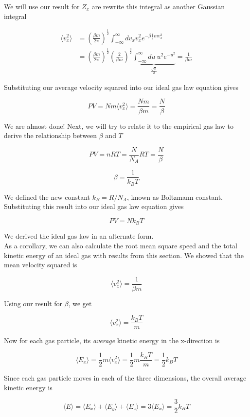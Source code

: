 \documentclass[12pt, a4paper]{article}
\begin{document}
We will use our result for $Z_x$ are rewrite this integral as another Gaussian integral

\begin{align*}
\langle v_x^2 \rangle &= \left( \frac{\beta m}{2\pi} \right)^{\frac12} \int_{-\infty}^\infty dv_x v_x^2 e^{-\beta \frac{1}{2}m v_x^2} \\
&= \left( \frac{\beta m}{2\pi} \right)^{\frac12} \left( \frac{2}{\beta m} \right)^{\frac32} \underbrace{\int_{-\infty}^\infty du \: u^2 e^{-u^2}}_{\frac{\sqrt{\pi}}{2}} = \frac{1}{\beta m}
\end{align*}

Substituting our average velocity squared into our ideal gas law equation gives

$$PV=Nm\langle v_x^2 \rangle=\frac{Nm}{\beta m}=\frac{N}{\beta}$$

We are almost done! Next, we will try to relate it to the empirical gas law to derive the relationship between $\beta$ and $T$

$$PV=nRT=\frac{N}{N_A}RT=\frac{N}{\beta}$$

$$\boxed{\beta=\frac{1}{k_BT}}$$

We defined the new constant $k_B=R/N_A$, known as Boltzmann constant. Substituting this result into our ideal gas law equation gives

$$\boxed{PV=Nk_BT}$$

We derived the ideal gas law in an alternate form. \\

As a corollary, we can also calculate the root mean square speed and the total kinetic energy of an ideal gas with results from this section. We showed that the mean velocity squared is

$$\langle v_x^2 \rangle=\frac{1}{\beta m}$$

Using our result for $\beta$, we get

$$\langle v_x^2 \rangle=\frac{k_BT}{m}$$

Now for each gas particle, its \textit{average} kinetic energy in the x-direction is

$$\langle E_x \rangle = \frac12m\langle v_x^2 \rangle = \frac12m\frac{k_BT}{m}=\frac12k_BT$$

Since each gas particle moves in each of the three dimensions, the overall average kinetic energy is

$$\langle E \rangle = \langle E_x \rangle + \langle E_y \rangle + \langle E_z \rangle = 3\langle E_x \rangle = \frac32k_BT$$
\end{document}

